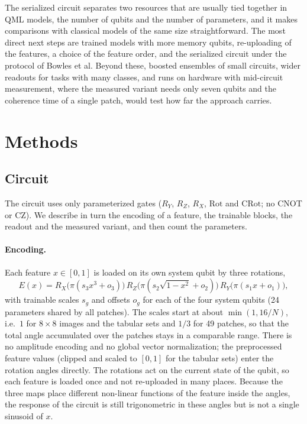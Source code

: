 \documentclass[11pt]{article}
\begin{document}
The serialized circuit separates two resources that are usually tied together in QML models, the number of qubits and the number of parameters, and it makes comparisons with classical models of the same size straightforward. The most direct next steps are trained models with more memory qubits, re-uploading of the features, a choice of the feature order, and the serialized circuit under the protocol of Bowles et al. Beyond these, boosted ensembles of small circuits, wider readouts for tasks with many classes, and runs on hardware with mid-circuit measurement, where the measured variant needs only seven qubits and the coherence time of a single patch, would test how far the approach carries.

%
\section{Methods}
\label{sec:methods}

\subsection{Circuit}
\label{sec:meth-circuit}

The circuit uses only parameterized gates ($R_Y$, $R_Z$, $R_X$, $\mathrm{Rot}$ and $\mathrm{CRot}$; no CNOT or CZ). We describe in turn the encoding of a feature, the trainable blocks, the readout and the measured variant, and then count the parameters.

\paragraph{Encoding.}
Each feature $x\in[0,1]$ is loaded on its own system qubit by three rotations,
\begin{equation}
  E(x)=R_X\!\big(\pi(s_3x^{3}+o_3)\big)\,R_Z\!\big(\pi(s_2\sqrt{1-x^{2}}+o_2)\big)\,R_Y\!\big(\pi(s_1x+o_1)\big),
  \label{eq:encoding}
\end{equation}
with trainable scales $s_g$ and offsets $o_g$ for each of the four system qubits (24 parameters shared by all patches). The scales start at about $\min(1,16/N)$, i.e.\ $1$ for $8\times8$ images and the tabular sets and $1/3$ for 49 patches, so that the total angle accumulated over the patches stays in a comparable range. There is no amplitude encoding and no global vector normalization; the preprocessed feature values (clipped and scaled to $[0,1]$ for the tabular sets) enter the rotation angles directly. The rotations act on the current state of the qubit, so each feature is loaded once and not re-uploaded in many places. Because the three maps place different non-linear functions of the feature inside the angles, the response of the circuit is still trigonometric in these angles but is not a single sinusoid of $x$.
\end{document}
